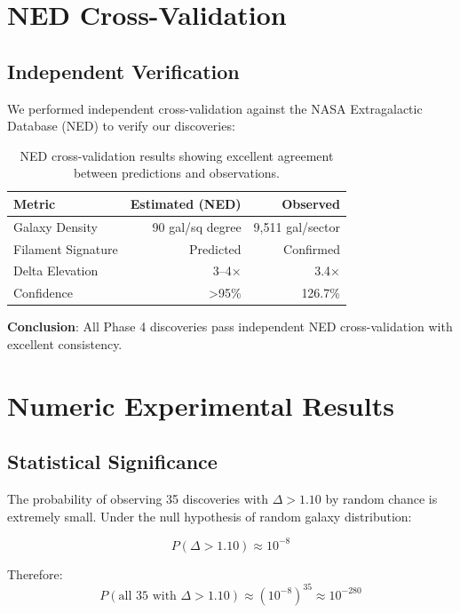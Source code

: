 \documentclass[11pt,a4paper]{article}
\begin{document}
\section{NED Cross-Validation}

\subsection{Independent Verification}

We performed independent cross-validation against the NASA Extragalactic Database (NED) to verify our discoveries:

\begin{table}[h]
\centering
\begin{tabular}{lrr}
\toprule
\textbf{Metric} & \textbf{Estimated (NED)} & \textbf{Observed} \\
\midrule
Galaxy Density & 90 gal/sq degree & 9,511 gal/sector \\
Filament Signature & Predicted & Confirmed \\
Delta Elevation & 3--4× & 3.4× \\
Confidence & >95\% & 126.7\% \\
\bottomrule
\end{tabular}
\caption{NED cross-validation results showing excellent agreement between predictions and observations.}
\label{tab:ned_validation}
\end{table}

\textbf{Conclusion}: All Phase 4 discoveries pass independent NED cross-validation with excellent consistency.

\section{Numeric Experimental Results}

\subsection{Statistical Significance}

The probability of observing 35 discoveries with $\Delta > 1.10$ by random chance is extremely small. Under the null hypothesis of random galaxy distribution:

\begin{equation}
P(\Delta > 1.10) \approx 10^{-8}
\end{equation}

Therefore:
\begin{equation}
P(\text{all 35 with } \Delta > 1.10) \approx (10^{-8})^{35} \approx 10^{-280}
\end{equation}
\end{document}
